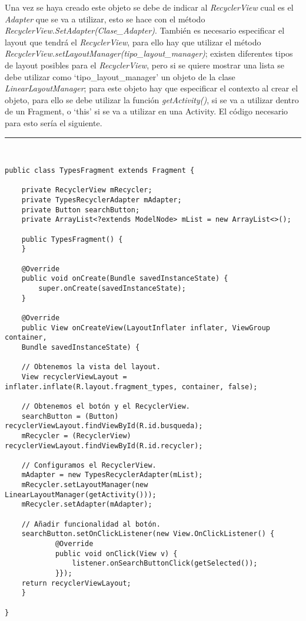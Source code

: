 Una vez se haya creado este objeto se debe de indicar al \textit{RecyclerView} cual es el \textit{Adapter} que se va a utilizar, esto se hace con el método \textit{RecyclerView.SetAdapter(Clase\_Adapter)}. También es necesario especificar el layout que tendrá el \textit{RecyclerView}, para ello hay que utilizar el método \textit{RecyclerView.setLayoutManager(tipo\_layout\_manager)}; existen diferentes tipos de layout posibles para el \textit{RecyclerView}, pero si se quiere mostrar una lista se debe utilizar como \enquote*{tipo\_layout\_manager} un objeto de la clase \textit{LinearLayoutManager}; para este objeto hay que especificar el contexto al crear el objeto, para ello se debe utilizar la función \textit{getActivity()}, si se va a utilizar dentro de un Fragment, o \enquote*{this} si se va a utilizar en una Activity. El código necesario para esto sería el siguiente.\newline
\newpage
\noindent\rule[-1ex]{\textwidth}{1pt}\\
\begin{lstlisting}[caption=Código de una clase que contiene un RecyclerView.]
public class TypesFragment extends Fragment {

	private RecyclerView mRecycler;
	private TypesRecyclerAdapter mAdapter;
	private Button searchButton;
	private ArrayList<?extends ModelNode> mList = new ArrayList<>();
	
	public TypesFragment() {
	}
	
	@Override
	public void onCreate(Bundle savedInstanceState) {
		super.onCreate(savedInstanceState);
	}
	
	@Override
	public View onCreateView(LayoutInflater inflater, ViewGroup container,
	Bundle savedInstanceState) {
	
	// Obtenemos la vista del layout.
	View recyclerViewLayout = inflater.inflate(R.layout.fragment_types, container, false);
	
	// Obtenemos el botón y el RecyclerView.
	searchButton = (Button) recyclerViewLayout.findViewById(R.id.busqueda);
	mRecycler = (RecyclerView) recyclerViewLayout.findViewById(R.id.recycler);
	
	// Configuramos el RecyclerView.
	mAdapter = new TypesRecyclerAdapter(mList);
	mRecycler.setLayoutManager(new LinearLayoutManager(getActivity()));
	mRecycler.setAdapter(mAdapter);
	
	// Añadir funcionalidad al botón.
	searchButton.setOnClickListener(new View.OnClickListener() {
			@Override
			public void onClick(View v) {
				listener.onSearchButtonClick(getSelected());
			}});
	return recyclerViewLayout;
	}	

}
\end{lstlisting}
